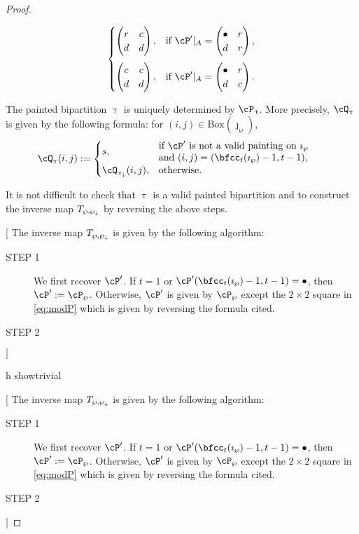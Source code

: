 \documentclass[12pt,a4paper]{amsart}
\newcommand{\trivial}[2][]{\if\relax\detokenize{#1}\relax
  {%
      \color{orange} \vspace{0em} $[$  #2 $]$
      \color{black}
  }
  \else
\ifx#1h
\ifcsname showtrivial\endcsname
{%
    \color{orange} \vspace{0em}  $[$ #2 $]$
    \color{black}
}
\fi
\else {\red Wrong argument!} \fi
\fi
}
\numberwithin{equation}{section}
\theoremstyle{remark}
\def\BOX#1{\mathrm{Box}(#1)}
\begin{document}
\begin{proof}
\begin{description}
\begin{itemize}
\begin{equation}
\begin{split}
\begin{cases}
                  \begin{pmatrix}
                    r & c\\
                    d & d
                  \end{pmatrix}, & \text{if } \cP'|_A =
                  \begin{pmatrix}
                    \bullet & r\\
                    d & r
                  \end{pmatrix},\\[1.5em]
                  \begin{pmatrix}
                    c & c\\
                    d & d
                  \end{pmatrix}, & \text{if } \cP'|_A =
                  \begin{pmatrix}
                    \bullet & r\\
                    d & c
                  \end{pmatrix}.\\
                \end{cases}
              \end{split}
            \end{equation}
          \end{itemize}

    \item[STEP 3] The painted bipartition $\uptau$ is uniquely determined by
          $\cP_{\uptau}$. More precisely, $\cQ_{\uptau}$ is given by the following
          formula: for $(i,j)\in \BOX{\jmath_{\wp}}$,
          \[
          \cQ_{\uptau}(i,j) :=
          \begin{cases}
            s, & \begin{minipage}{17em}if $\cP'$ is not a valid painting on $\imath_{\wp}$\\
              and $(i,j)= (\bfcc_{t}(\imath_{\wp})-1,t-1)$,
              \end{minipage}\\
            \cQ_{\uptaum}(i,j), & \text{otherwise.}
            \end{cases}
          \]
  \end{description}

 It is not difficult to check that $\uptau$ is a valid painted bipartition
 and to construct the inverse map $T_{\wp,\wp_{\downarrow}}$ by reversing the above steps.

 \trivial[]{
   The inverse map $T_{\wp,\wp_{\downarrow}}$ is given by the following algorithm:
   \begin{description}
     \item[STEP 1] We first recover $\cP'$.
           If $t=1$ or $\cP'(\bfcc_{t}(\imath_{\wp})-1,t-1)=\bullet$, then
           $\cP':= \cP_{\wp}$.
           Otherwise,
           $\cP'$ is given by $\cP_{\wp}$ except the $2\times 2$ square in
           \eqref{eq:modP} which is given by reversing the formula cited.
     \item[STEP 2]


\end{description}}
\end{proof}
\end{document}
